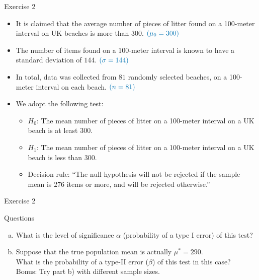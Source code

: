 \documentclass[
  11pt,
  ignorenonframetext,
]{beamer}
\providecommand{\tightlist}{%
  \setlength{\itemsep}{0pt}\setlength{\parskip}{0pt}}
\begin{document}
\begin{frame}{Exercise 2}
\protect\hypertarget{exercise-2}{}
\begin{itemize}
\item
  It is claimed that the average number of pieces of litter found on a
  100-meter interval on UK beaches is more than \(300\).
  \(\color{blue}{(\mu_0=300})\)
\item
  The number of items found on a 100-meter interval is known to have a
  standard deviation of \(144\). \(\color{blue}{(\sigma=144})\)
\item
  In total, data was collected from \(81\) randomly selected beaches, on
  a 100-meter interval on each beach. \(\color{blue}{(n=81})\)
\item
  We adopt the following test:

  \begin{itemize}
  \tightlist
  \item
    \(H_0\): The mean number of pieces of litter on a 100-meter interval
    on a UK beach is at least \(300\).
  \item
    \(H_1\): The mean number of pieces of litter on a 100-meter interval
    on a UK beach is less than \(300\).
  \item
    Decision rule: ``The null hypothesis will not be rejected if the
    sample mean is \(276\) items or more, and will be rejected
    otherwise.''
  \end{itemize}
\end{itemize}
\end{frame}

\begin{frame}{Exercise 2}
\protect\hypertarget{exercise-2-1}{}
\begin{block}{Questions}
\protect\hypertarget{questions-1}{}
\vspace{1mm}

\begin{enumerate}
[a)]
\tightlist
\item
  What is the level of significance \(\alpha\) (probability of a type I
  error) of this test?
\item
  Suppose that the true population mean is actually \(\mu^* = 290\).\\
  What is the probability of a type-II error (\(\beta\)) of this test in
  this case?\\
  Bonus: Try part b) with different sample sizes.
\end{enumerate}
\end{block}
\end{frame}
\end{document}
